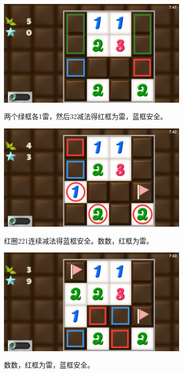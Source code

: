 \subsection{} %
\begin{center}
    \includegraphics[width=0.7\textwidth]{puzzle/45-1.png}
\end{center}
两个绿框各1雷，然后32减法得红框为雷，蓝框安全。
\begin{center}
    \includegraphics[width=0.7\textwidth]{puzzle/45-2.png}
\end{center}
红圈221连续减法得蓝框安全。数数，红框为雷。
\begin{center}
    \includegraphics[width=0.7\textwidth]{puzzle/45-3.png}
\end{center}
数数，红框为雷，蓝框安全。

